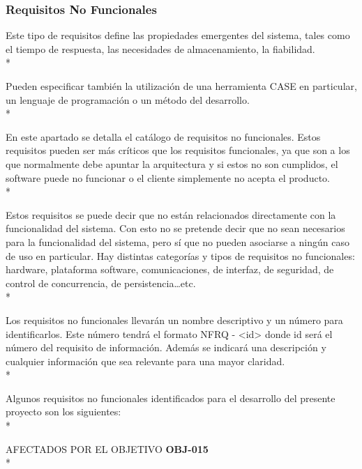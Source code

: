 \documentclass[../pfc.tex]{subfiles}
\begin{document}
	
	
	

	
	
		
	
		 
		
	


	\subsubsection{Requisitos No Funcionales}
	
	Este tipo de requisitos define las propiedades emergentes del sistema, tales como el tiempo de
	respuesta, las necesidades de almacenamiento, la fiabilidad.\\*
	
	Pueden especificar también la utilización de una herramienta CASE en particular, un lenguaje
	de programación o un método del desarrollo.\\*
	
	En este apartado se detalla el catálogo de requisitos no funcionales. Estos requisitos pueden
	ser más críticos que los requisitos funcionales, ya que son a los que normalmente debe apuntar la
	arquitectura y si estos no son cumplidos, el software puede no funcionar o el cliente simplemente
	no acepta el producto.\\*
	
	Estos requisitos se puede decir que no están relacionados directamente con la funcionalidad
	del sistema. Con esto no se pretende decir que no sean necesarios para la funcionalidad del sistema,
	pero sí que no pueden asociarse a ningún caso de uso en particular. Hay distintas categorías y tipos
	de requisitos no funcionales: hardware, plataforma software, comunicaciones, de interfaz, de
	seguridad, de control de concurrencia, de persistencia…etc.\\*
	
	Los requisitos no funcionales llevarán un nombre descriptivo y un número para identificarlos.
	Este número tendrá el formato NFRQ - <id> donde id será el número del requisito de información.
	Además se indicará una descripción y cualquier información que sea relevante para una mayor
	claridad.\\*
	
	Algunos requisitos no funcionales identificados para el desarrollo del presente proyecto son
	los siguientes:\\*

	AFECTADOS POR EL OBJETIVO 	\textbf{OBJ-015}\\*
		
\end{document}
